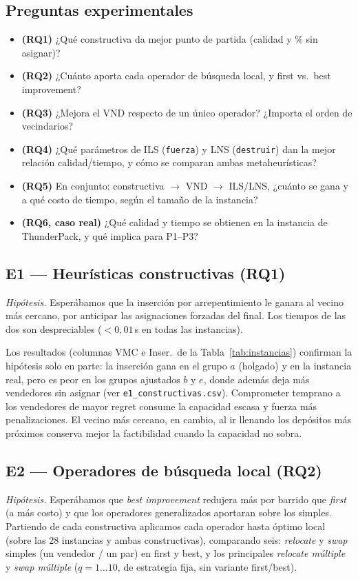 \documentclass[11pt,a4paper]{article}
\newcommand{\code}[1]{\texttt{#1}}
\begin{document}
\subsection{Preguntas experimentales}
\begin{itemize}
  \item \textbf{(RQ1)} ¿Qué constructiva da mejor punto de partida (calidad y \% sin asignar)?
  \item \textbf{(RQ2)} ¿Cuánto aporta cada operador de búsqueda local, y first vs.\ best
        improvement?
  \item \textbf{(RQ3)} ¿Mejora el VND respecto de un único operador? ¿Importa el orden de
        vecindarios?
  \item \textbf{(RQ4)} ¿Qué parámetros de ILS (\code{fuerza}) y LNS (\code{destruir}) dan la
        mejor relación calidad/tiempo, y cómo se comparan ambas metaheurísticas?
  \item \textbf{(RQ5)} En conjunto: constructiva $\to$ VND $\to$ ILS/LNS, ¿cuánto se gana y a
        qué costo de tiempo, según el tamaño de la instancia?
  \item \textbf{(RQ6, caso real)} ¿Qué calidad y tiempo se obtienen en la instancia de
        ThunderPack, y qué implica para P1--P3?
\end{itemize}

\subsection{E1 --- Heurísticas constructivas (RQ1)}
\emph{Hipótesis.} Esperábamos que la inserción por arrepentimiento le ganara al vecino más
cercano, por anticipar las asignaciones forzadas del final. Los tiempos de las dos son
despreciables ($<0{,}01$\,s en todas las instancias).

Los resultados (columnas VMC e Inser.\ de la Tabla~\ref{tab:instancias}) confirman la hipótesis
solo en parte: la inserción gana en el grupo $a$ (holgado) y en la instancia real, pero es peor
en los grupos ajustados $b$ y $e$, donde además deja más vendedores sin asignar (ver
\code{e1\_constructivas.csv}). Comprometer temprano a los vendedores de mayor regret consume la
capacidad escasa y fuerza más penalizaciones. El vecino más cercano, en cambio, al ir llenando
los depósitos más próximos conserva mejor la factibilidad cuando la capacidad no sobra.

\subsection{E2 --- Operadores de búsqueda local (RQ2)}
\emph{Hipótesis.} Esperábamos que \emph{best improvement} redujera más por barrido que
\emph{first} (a más costo) y que los operadores generalizados aportaran sobre los simples.
Partiendo de cada constructiva aplicamos cada operador hasta óptimo local (sobre las 28
instancias y ambas constructivas), comparando seis: \emph{relocate} y \emph{swap} simples (un
vendedor / un par) en first y best, y los principales \emph{relocate múltiple} y \emph{swap
múltiple} ($q{=}1\dots10$, de estrategia fija, sin variante first/best).
\end{document}
